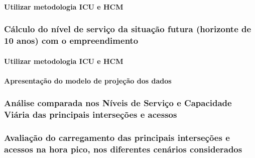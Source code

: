 \documentclass[]{article}
\let\oldparagraph\paragraph
\renewcommand{\paragraph}[1]{\oldparagraph{#1}\mbox{}}
\begin{document}
\hypertarget{utilizar-metodologia-icu-e-hcm-1}{%
\paragraph{Utilizar metodologia ICU e
HCM}\label{utilizar-metodologia-icu-e-hcm-1}}

\hypertarget{cuxe1lculo-do-nuxedvel-de-serviuxe7o-da-situauxe7uxe3o-futura-horizonte-de-10-anos-com-o-empreendimento}{%
\subsubsection{Cálculo do nível de serviço da situação futura (horizonte
de 10 anos) com o
empreendimento}\label{cuxe1lculo-do-nuxedvel-de-serviuxe7o-da-situauxe7uxe3o-futura-horizonte-de-10-anos-com-o-empreendimento}}

\hypertarget{utilizar-metodologia-icu-e-hcm-2}{%
\paragraph{Utilizar metodologia ICU e
HCM}\label{utilizar-metodologia-icu-e-hcm-2}}

\hypertarget{apresentauxe7uxe3o-do-modelo-de-projeuxe7uxe3o-dos-dados}{%
\paragraph{Apresentação do modelo de projeção dos
dados}\label{apresentauxe7uxe3o-do-modelo-de-projeuxe7uxe3o-dos-dados}}

\hypertarget{anuxe1lise-comparada-nos-nuxedveis-de-serviuxe7o-e-capacidade-viuxe1ria-das-principais-interseuxe7uxf5es-e-acessos}{%
\subsubsection{Análise comparada nos Níveis de Serviço e Capacidade
Viária das principais interseções e
acessos}\label{anuxe1lise-comparada-nos-nuxedveis-de-serviuxe7o-e-capacidade-viuxe1ria-das-principais-interseuxe7uxf5es-e-acessos}}

\hypertarget{avaliauxe7uxe3o-do-carregamento-das-principais-interseuxe7uxf5es-e-acessos-na-hora-pico-nos-diferentes-cenuxe1rios-considerados}{%
\subsubsection{Avaliação do carregamento das principais interseções e
acessos na hora pico, nos diferentes cenários
considerados}\label{avaliauxe7uxe3o-do-carregamento-das-principais-interseuxe7uxf5es-e-acessos-na-hora-pico-nos-diferentes-cenuxe1rios-considerados}}
\end{document}
